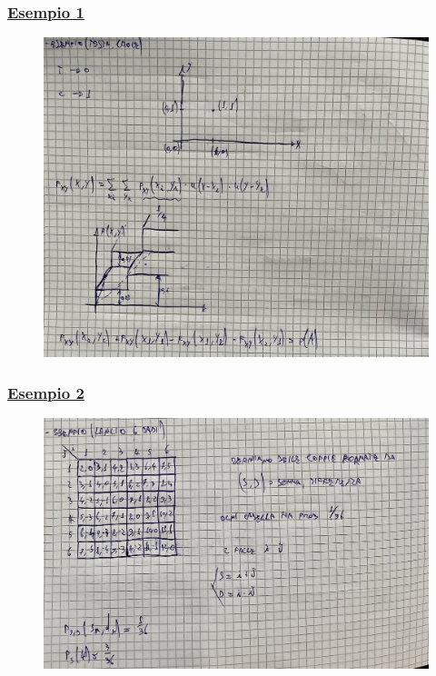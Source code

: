 \documentclass{article}
\begin{document}
\subsubsection{\underline{Esempio 1}}
\begin{figure}[H]
\centering
\includegraphics[scale=0.14]{ese/42.jpeg}
\end{figure} 
\subsubsection{\underline{Esempio 2}}
\begin{figure}[H]
\centering
\includegraphics[scale=0.14]{ese/43.jpeg}
\end{figure} 
\end{document}
